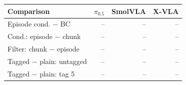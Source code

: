 \begin{tabular}{lrrr}
\toprule
Comparison & $\pi_{0.5}$ & SmolVLA & X-VLA \\
\midrule
Episode cond. $-$ BC & -- & -- & -- \\
Cond.: episode $-$ chunk & -- & -- & -- \\
Filter: chunk $-$ episode & -- & -- & -- \\
Tagged $-$ plain: untagged & -- & -- & -- \\
Tagged $-$ plain: tag 5 & -- & -- & -- \\
\bottomrule
\end{tabular}
